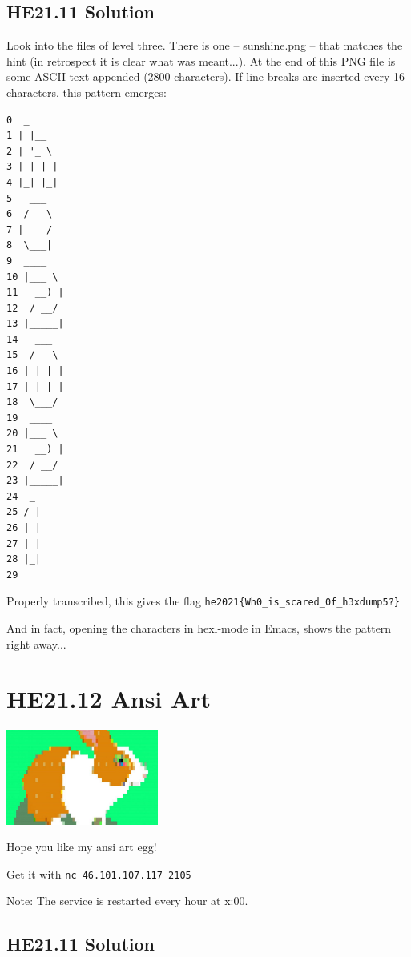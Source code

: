 \documentclass[english,a4paper,nols,noindent]{tufte-handout}
\begin{document}
\hypertarget{he21.11-solution}{%
\subsection{HE21.11 Solution}\label{he21.11-solution}}
Look into the files of level three. There is one -- sunshine.png --
that matches the hint (in retrospect it is clear what was meant...).
At the end of this PNG file is some ASCII text appended (2800
characters).  If line breaks are inserted every 16 characters, this
pattern emerges:

\begin{verbatim}
0  _              
1 | |__           
2 | '_ \          
3 | | | |         
4 |_| |_|         
5   ___           
6  / _ \          
7 |  __/          
8  \___|          
9  ____           
10 |___ \          
11   __) |         
12  / __/          
13 |_____|         
14   ___           
15  / _ \          
16 | | | |         
17 | |_| |         
18  \___/          
19  ____           
20 |___ \          
21   __) |         
22  / __/          
23 |_____|         
24  _              
25 / |             
26 | |             
27 | |             
28 |_|             
29
\end{verbatim}

Properly transcribed, this gives the flag \verb+he2021{Wh0_is_scared_0f_h3xdump5?}+

And in fact, opening the characters in hexl-mode in Emacs, shows the pattern right away...


\hypertarget{he21.12}{%
\section{HE21.12 Ansi Art}\label{he21.12}}
\begin{marginfigure}
    \includegraphics[width=50mm]{images/challenge12.jpg}
\end{marginfigure}

Hope you like my ansi art egg!

Get it with \verb+nc 46.101.107.117 2105+

Note: The service is restarted every hour at x:00.

\hypertarget{he21.11-solution}{%
\subsection{HE21.11 Solution}\label{he21.11-solution}}
\end{document}
